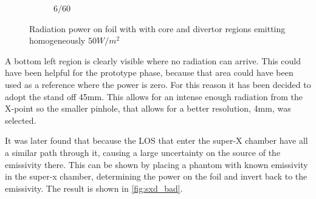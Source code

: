 \begin{figure}
\begin{subfigure}{0.50\textwidth}
         \caption{$6/60$}
         \label{fig:6_60_all}
     \end{subfigure}

    \caption{Radiation power on foil with with core and divertor regions emitting homogeneously $50W/m^2$}
    \label{fig:cherab2}
\end{figure}

A bottom left region is clearly visible where no radiation can arrive. This could have been helpful for the prototype phase, because that area could have been used as a reference where the power is zero.
For this reason it has been decided to adopt the stand off 45mm. This allows for an intense enough radiation from the X-point so the smaller pinhole, that allows for a better resolution, 4mm, was selected.

It was later found that because the LOS that enter the super-X chamber have all a similar path through it, causing a large uncertainty on the source of the emissivity there. This can be shown by placing a phantom with known emissivity in the super-x chamber, determining the power on the foil and invert back to the emissivity. The result is shown in \autoref{fig:sxd_bad}.

